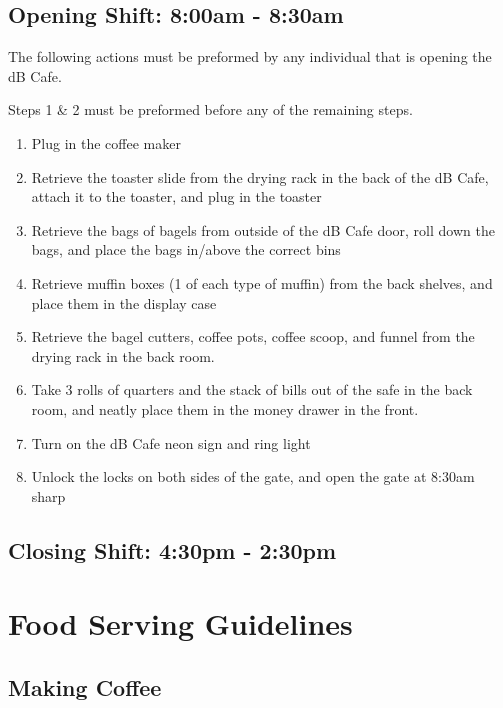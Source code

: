 \documentclass[12pt,onecolumn,letterpaper]{article}
\begin{document}
\subsection{Opening Shift: 8:00am - 8:30am}
The following actions must be preformed by any individual that is opening the dB Cafe.

Steps 1 \& 2 must be preformed before any of the remaining steps.
\begin{enumerate}
\item Plug in the coffee maker
\item Retrieve the toaster slide from the drying rack in the back of the dB Cafe, attach it to the toaster, and plug in the toaster 
\item Retrieve the bags of bagels from outside of the dB Cafe door, roll down the bags, and place the bags in/above the correct bins
\item Retrieve muffin boxes (1 of each type of muffin) from the back shelves, and place them in the display case
\item Retrieve the bagel cutters, coffee pots, coffee scoop, and funnel from the drying rack in the back room.
\item Take 3 rolls of quarters and the stack of bills out of the safe in the back room, and neatly place them in the money drawer in the front.
\item Turn on the dB Cafe neon sign and ring light
\item Unlock the locks on both sides of the gate, and open the gate at 8:30am sharp
\end{enumerate}
\subsection{Closing Shift: 4:30pm - 2:30pm}

\section{Food Serving Guidelines}
\subsection{Making Coffee}
\end{document}
